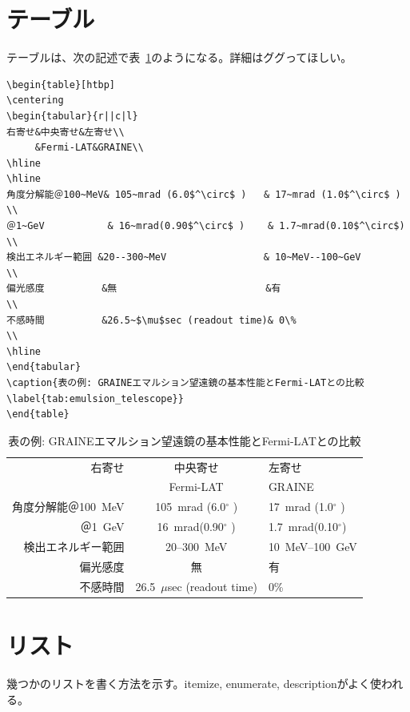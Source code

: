 \documentclass[a4j]{jsarticle}
\begin{document}
\section{テーブル}
テーブルは、次の記述で表~\ref{tab:emulsion_telescope}のようになる。詳細はググってほしい。
\begin{verbatim}
\begin{table}[htbp]
\centering
\begin{tabular}{r||c|l}
右寄せ&中央寄せ&左寄せ\\
     &Fermi-LAT&GRAINE\\
\hline
\hline
角度分解能＠100~MeV& 105~mrad (6.0$^\circ$ )   & 17~mrad (1.0$^\circ$ ) \\
＠1~GeV           & 16~mrad(0.90$^\circ$ )    & 1.7~mrad(0.10$^\circ$) \\
検出エネルギー範囲 &20--300~MeV                 & 10~MeV--100~GeV        \\
偏光感度          &無                          &有                      \\
不感時間          &26.5~$\mu$sec (readout time)& 0\%                    \\
\hline
\end{tabular}
\caption{表の例: GRAINEエマルション望遠鏡の基本性能とFermi-LATとの比較\label{tab:emulsion_telescope}}
\end{table}
\end{verbatim}
\begin{table}[htbp]
\centering
\begin{tabular}{r||c|l}
右寄せ&中央寄せ&左寄せ\\
     &Fermi-LAT&GRAINE\\
\hline
\hline
角度分解能＠100~MeV& 105~mrad (6.0$^\circ$ )   & 17~mrad (1.0$^\circ$ ) \\
＠1~GeV           & 16~mrad(0.90$^\circ$ )    & 1.7~mrad(0.10$^\circ$) \\
検出エネルギー範囲 &20--300~MeV                 & 10~MeV--100~GeV        \\
偏光感度          &無                          &有                      \\
不感時間          &26.5~$\mu$sec (readout time)& 0\%                    \\
\hline
\end{tabular}
\caption{表の例: GRAINEエマルション望遠鏡の基本性能とFermi-LATとの比較\label{tab:emulsion_telescope}}
\end{table}

\newpage
\section{リスト}
幾つかのリストを書く方法を示す。itemize, enumerate, descriptionがよく使われる。
\end{document}
